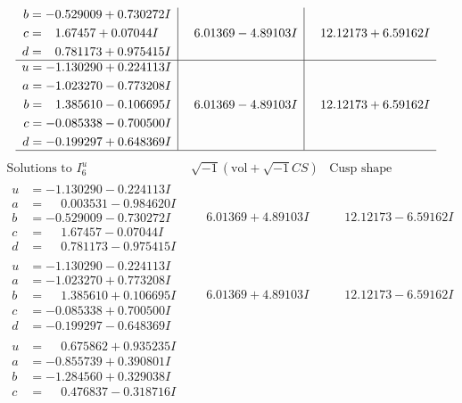 \documentclass[1p]{elsarticle_modified}
\theoremstyle{definition}
\newcommand{\I}{\sqrt{-1}}
\begin{document}
$$\begin{array}{c|c|c}
\begin{aligned}
b &= -0.529009 + 0.730272 I \\
c &= \phantom{-}1.67457 + 0.07044 I \\
d &= \phantom{-}0.781173 + 0.975415 I\end{aligned}
 & \phantom{-}6.01369 - 4.89103 I & \phantom{-}12.12173 + 6.59162 I \\ \hline\begin{aligned}
u &= -1.130290 + 0.224113 I \\
a &= -1.023270 - 0.773208 I \\
b &= \phantom{-}1.385610 - 0.106695 I \\
c &= -0.085338 - 0.700500 I \\
d &= -0.199297 + 0.648369 I\end{aligned}
 & \phantom{-}6.01369 - 4.89103 I & \phantom{-}12.12173 + 6.59162 I\\
 \hline 
 \end{array}$$\newpage$$\begin{array}{c|c|c}  
\text{Solutions to }I^u_{6}& \I (\text{vol} + \sqrt{-1}CS) & \text{Cusp shape}\\
 \hline 
\begin{aligned}
u &= -1.130290 - 0.224113 I \\
a &= \phantom{-}0.003531 - 0.984620 I \\
b &= -0.529009 - 0.730272 I \\
c &= \phantom{-}1.67457 - 0.07044 I \\
d &= \phantom{-}0.781173 - 0.975415 I\end{aligned}
 & \phantom{-}6.01369 + 4.89103 I & \phantom{-}12.12173 - 6.59162 I \\ \hline\begin{aligned}
u &= -1.130290 - 0.224113 I \\
a &= -1.023270 + 0.773208 I \\
b &= \phantom{-}1.385610 + 0.106695 I \\
c &= -0.085338 + 0.700500 I \\
d &= -0.199297 - 0.648369 I\end{aligned}
 & \phantom{-}6.01369 + 4.89103 I & \phantom{-}12.12173 - 6.59162 I \\ \hline\begin{aligned}
u &= \phantom{-}0.675862 + 0.935235 I \\
a &= -0.855739 + 0.390801 I \\
b &= -1.284560 + 0.329038 I \\
c &= \phantom{-}0.476837 - 0.318716 I \\

\end{aligned}
\end{array}$$
\end{document}
